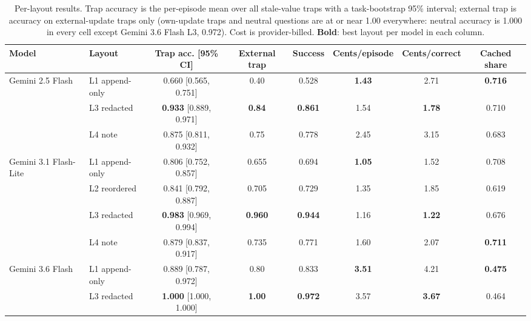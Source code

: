 \begin{table}[t]
\centering\small
\setlength{\tabcolsep}{4pt}
\begin{tabular}{@{}llcccccc@{}}
\toprule
Model & Layout & Trap acc. [95\% CI] & External trap & Success & Cents/episode & Cents/correct & Cached share \\
\midrule
Gemini 2.5 Flash & L1 append-only & 0.660 [0.565, 0.751] & 0.40 & 0.528 & \textbf{1.43} & 2.71 & \textbf{0.716} \\
 & L3 redacted & \textbf{0.933} [0.889, 0.971] & \textbf{0.84} & \textbf{0.861} & 1.54 & \textbf{1.78} & 0.710 \\
 & L4 note & 0.875 [0.811, 0.932] & 0.75 & 0.778 & 2.45 & 3.15 & 0.683 \\
\midrule
Gemini 3.1 Flash-Lite & L1 append-only & 0.806 [0.752, 0.857] & 0.655 & 0.694 & \textbf{1.05} & 1.52 & 0.708 \\
 & L2 reordered & 0.841 [0.792, 0.887] & 0.705 & 0.729 & 1.35 & 1.85 & 0.619 \\
 & L3 redacted & \textbf{0.983} [0.969, 0.994] & \textbf{0.960} & \textbf{0.944} & 1.16 & \textbf{1.22} & 0.676 \\
 & L4 note & 0.879 [0.837, 0.917] & 0.735 & 0.771 & 1.60 & 2.07 & \textbf{0.711} \\
\midrule
Gemini 3.6 Flash & L1 append-only & 0.889 [0.787, 0.972] & 0.80 & 0.833 & \textbf{3.51} & 4.21 & \textbf{0.475} \\
 & L3 redacted & \textbf{1.000} [1.000, 1.000] & \textbf{1.00} & \textbf{0.972} & 3.57 & \textbf{3.67} & 0.464 \\
\bottomrule
\end{tabular}
\caption{Per-layout results. Trap accuracy is the per-episode mean over all stale-value traps with a task-bootstrap 95\% interval; external trap is accuracy on external-update traps only (own-update traps and neutral questions are at or near 1.00 everywhere: neutral accuracy is 1.000 in every cell except Gemini 3.6 Flash L3, 0.972). Cost is provider-billed. \textbf{Bold}: best layout per model in each column.}
\label{tab:main}
\end{table}

